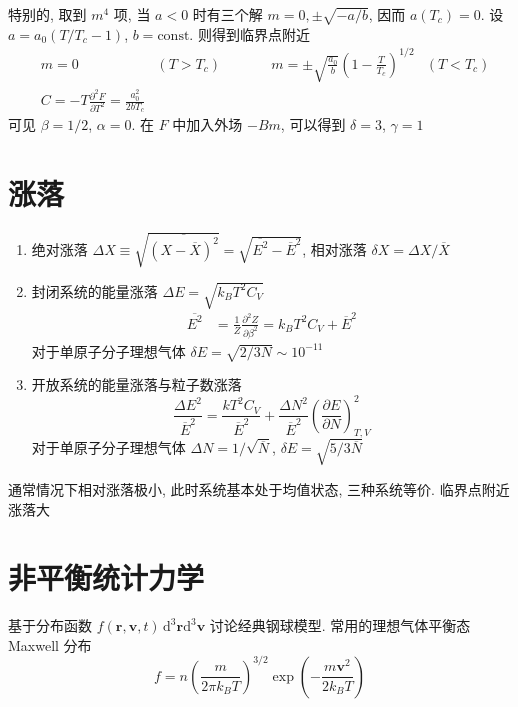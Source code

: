 \documentclass[12pt,a4paper]{article}%
\numberwithin{equation}{section}
\renewcommand*{\vec}[1]{\bm{#1}}%
\newcommand{\dif}{\mathrm{d}}
\newcommand{\diff}{\,\mathrm{d}}
\begin{document}
\begin{enumerate}
    特别的, 取到 $m^4$ 项, 当 $a<0$ 时有三个解 $m = 0,\pm\sqrt{-a/b}$, 因而 $a(T_c) =0$. 设 $a = a_0(T/T_c-1)$, $b = \mbox{const.}$ 则得到临界点附近
    \begin{align}
        &m = 0 &(T>T_c) &\qquad& m = \pm\sqrt{\frac{a_0}{b}}\left(1-\frac{T}{T_c}\right)^{1/2} &(T<T_c) \\
        &C = -T\frac{\partial^2 F}{\partial T^2} = \frac{a_0^2}{2bT_c}
    \end{align}
    可见 $\beta = 1/2$, $\alpha = 0$. 在 $F$ 中加入外场 $-Bm$, 可以得到 $\delta = 3$, $\gamma = 1$
\end{enumerate}

\section{涨落} %
\label{sec:fluctuation}
\begin{enumerate}
    \item 绝对涨落 $\Delta X \equiv \sqrt{\overline{(X-\overline X)^2}} = \sqrt{\overline{E^2} - \overline E^2}$, 相对涨落 $\delta X = \Delta X/ \overline X$
    \item 封闭系统的能量涨落 $\Delta E =\sqrt{k_BT^2C_V}$
    \begin{align}
        \overline{E^2} &= \frac 1Z \frac{\partial^2 Z}{\partial \beta^2} = k_BT^2C_V + \overline E^2
    \end{align}
    对于单原子分子理想气体 $\delta E = \sqrt{2/3N} \sim 10^{-11}$
    \item 开放系统的能量涨落与粒子数涨落
    \begin{equation}
        \frac{\Delta E^2}{\overline E^2} = \frac{kT^2C_V}{\overline E^2} + \frac{\Delta N^2}{\overline E^2}\left(\frac{\partial E}{\partial N}\right)_{T,V}^2
    \end{equation}
    对于单原子分子理想气体 $\Delta N = 1/\sqrt{\overline N}$, $\delta E = \sqrt{5/3\overline N}$
\end{enumerate}
通常情况下相对涨落极小, 此时系统基本处于均值状态, 三种系统等价. 临界点附近涨落大

\section{非平衡统计力学} %
\label{sec:non-equilibrium_SM}
基于分布函数 $f(\vec r,\vec v, t)\diff^3 \vec r\dif^3\vec v$ 讨论经典钢球模型. 常用的理想气体平衡态 Maxwell 分布
\begin{equation}
    f = n\left(\frac m{2\pi k_B T}\right)^{3/2}\exp\left(-\frac {m\vec v^2}{2k_B T}\right)
\end{equation}
\end{document}

